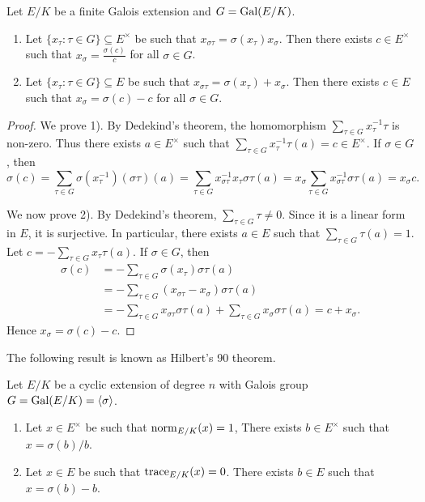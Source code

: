 \begin{proposition}
    Let $E/K$ be a finite Galois extension and $G=\operatorname{Gal}(E/K)$. 
    \begin{enumerate}
        \item Let $\{x_\tau:\tau\in G\}\subseteq E^\times$ be such that 
            $x_{\sigma\tau}=\sigma(x_\tau)x_\sigma$. Then there exists
            $c\in E^\times$ such that $x_\sigma=\frac{\sigma(c)}{c}$ for all $\sigma\in G$. 
        \item Let $\{x_\tau:\tau\in G\}\subseteq E$ be such that 
            $x_{\sigma\tau}=\sigma(x_\tau)+x_\sigma$. Then there exists
            $c\in E$ such that $x_\sigma=\sigma(c)-c$ for all $\sigma\in G$.  
    \end{enumerate}
\end{proposition}

\begin{proof}
    We prove 1). By Dedekind's theorem, the homomorphism 
    $\sum_{\tau\in G}x_{\tau}^{-1}\tau$ is non-zero. Thus there exists
    $a\in E^{\times}$ such that $\sum_{\tau\in G}x_{\tau}^{-1}\tau(a)=c\in E^{\times}$. 
    If $\sigma\in G$, 
    then 
    \[
    \sigma(c)=\sum_{\tau\in G}\sigma(x_{\tau}^{-1})(\sigma\tau)(a)=
    \sum_{\tau\in G}x_{\sigma\tau}^{-1}x_{\tau}\sigma\tau(a)
    =x_{\sigma}\sum_{\tau\in G}x_{\sigma\tau}^{-1}\sigma\tau(a)=x_{\sigma}c.
    \]
    
    We now prove 2). By Dedekind's theorem, $\sum_{\tau\in G}\tau\ne0$. Since
    it is a linear form in $E$, it is surjective. In particular, there exists 
    $a\in E$ such that $\sum_{\tau\in G}\tau(a)=1$. Let $c=-\sum_{\tau\in G}x_\tau\tau(a)$. 
    If $\sigma\in G$, then 
    \begin{align*}
        \sigma(c) &= -\sum_{\tau\in G}\sigma(x_{\tau})\sigma\tau(a)\\
        &=-\sum_{\tau\in G}(x_{\sigma\tau}-x_{\sigma})\sigma\tau(a)\\
        &=-\sum_{\tau\in G}x_{\sigma\tau}\sigma\tau(a)+\sum_{\tau\in G}x_{\sigma}\sigma\tau(a)
        =c+x_{\sigma}.
    \end{align*}
    Hence $x_{\sigma}=\sigma(c)-c$. 
\end{proof}

The following result is known as Hilbert's 90 theorem. 

\begin{theorem}[Hilbert]
    Let $E/K$ be a cyclic extension of degree $n$ with Galois group $G=\operatorname{Gal}(E/K)=\langle\sigma\rangle$. 
    \begin{enumerate}
        \item Let $x\in E^{\times}$ be such that $\operatorname{norm}_{E/K}(x)=1$, 
        There exists $b\in E^{\times}$ such that $x=\sigma(b)/b$. 
        \item Let  $x\in E$ be such that $\operatorname{trace}_{E/K}(x)=0$. 
        There exists $b\in E$ such that $x=\sigma(b)-b$. 
    \end{enumerate}
\end{theorem}

